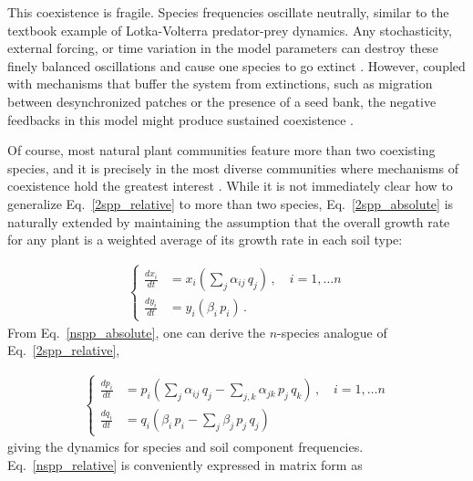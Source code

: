 \documentclass[11pt]{article}
\begin{document}
This coexistence is fragile. Species frequencies oscillate neutrally, similar to the textbook example of Lotka-Volterra predator-prey dynamics. Any stochasticity, external forcing, or time variation in the model parameters can destroy these finely balanced oscillations and cause one species to go extinct \citep{revilla2013plant}. However, coupled with mechanisms that buffer the system from extinctions, such as migration between desynchronized patches or the presence of a seed bank, the negative feedbacks in this model might produce sustained coexistence \citep{revilla2013plant, bever2003soil}. 

Of course, most natural plant communities feature more than two coexisting species, and it is precisely in the most diverse communities where mechanisms of coexistence hold the greatest interest \citep{van2013plant}. While it is not immediately clear how to generalize Eq.~\ref{2spp_relative} to more than two species, Eq.~\ref{2spp_absolute} is naturally extended by maintaining the assumption that the overall growth rate for any plant is a weighted average of its growth rate in each soil type:

\begin{align} \label{nspp_absolute}
\begin{cases}
\frac{dx_i}{dt} &= x_i \left(\sum_{j} \alpha_{ij} \, q_j \right) \, , \quad  i = 1, \dots n \\
\frac{dy_i}{dt} &= y_i \left( \beta_i \, p_i \right) \, .
\end{cases}
\end{align}
From Eq.~\ref{nspp_absolute}, one can derive the $n$-species analogue of Eq.~\ref{2spp_relative},

\begin{align} \label{nspp_relative}
\begin{cases}
\frac{dp_i}{dt} &= p_i \left(\sum_{j} \alpha_{ij} \, q_j - \sum_{j, k} \alpha_{jk} \, p_j \, q_k \right) \, , \quad  i = 1, \dots n \\
\frac{dq_i}{dt} &= q_i \left(\beta_{i} \, p_i - \sum_{j} \beta_{j} \, p_j \, q_j  \right) \,
\end{cases}
\end{align}
giving the dynamics for species and soil component frequencies. Eq.~\ref{nspp_relative} is conveniently expressed in matrix form as
\end{document}
